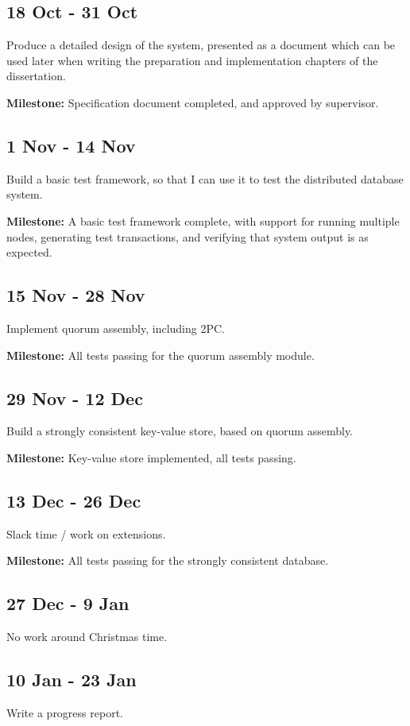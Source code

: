 \subsection*{18 Oct - 31 Oct}
Produce a detailed design of the system, presented as a document which can be used later when writing the preparation and implementation chapters of the dissertation.

\textbf{Milestone:} Specification document completed, and approved by supervisor.


\subsection*{1 Nov - 14 Nov}
Build a basic test framework, so that I can use it to test the distributed database system.

\textbf{Milestone:} A basic test framework complete, with support for running multiple nodes, generating test transactions, and verifying that system output is as expected.


\subsection*{15 Nov - 28 Nov}
Implement quorum assembly, including 2PC.

\textbf{Milestone:} All tests passing for the quorum assembly module.


\subsection*{29 Nov - 12 Dec}
Build a strongly consistent key-value store, based on quorum assembly.

\textbf{Milestone:} Key-value store implemented, all tests passing.


\subsection*{13 Dec - 26 Dec}
Slack time / work on extensions.

\textbf{Milestone:} All tests passing for the strongly consistent database.


\subsection*{27 Dec - 9 Jan}
No work around Christmas time.

\subsection*{10 Jan - 23 Jan}
Write a progress report.

